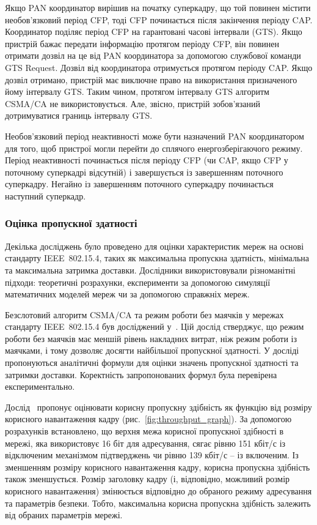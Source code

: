 \documentclass[a4paper,ukrainian,utf8,nocolumnsxix,floatsection]{eskdtext}
\renewcommand\paragraph{\subsubsection}
\newcommand{\figref}[1]{рис.~\ref{#1}}
\newcommand{\iee}[0]{IEEE~802.15.4\xspace}
\newcommand{\csma}[0]{CSMA/CA\xspace}
\begin{document}
Якщо PAN координатор вирішив на початку суперкадру, що  той повинен містити необов’язковий період CFP, тоді CFP починається після закінчення періоду CAP. Координатор поділяє період CFP на гарантовані часові інтервали (GTS). Якщо пристрій бажає передати інформацію протягом періоду CFP, він повинен отримати дозвіл на це від PAN координатора за допомогою службової команди GTS Request. Дозвіл від координатора отримується протягом періоду CAP. Якщо дозвіл отримано, пристрій має виключне право на використання призначеного йому інтервалу GTS. Таким чином, протягом інтервалу GTS алгоритм \csma не використовується. Але, звісно, пристрій зобов’язаний дотримуватися границь інтервалу GTS. 

Необов’язковий період неактивності може бути назначений PAN координатором для того, щоб пристрої могли перейти до сплячого енергозберігаючого режиму. Період неактивності починається після періоду CFP (чи CAP, якщо CFP у поточному суперкадрі відсутній) і завершується із завершенням поточного суперкадру.
Негайно із завершенням поточного суперкадру починається наступний суперкадр. 

\paragraph{Оцінка пропускної здатності}
\label{par:throughput:evaluation}

Декілька досліджень було проведено для оцінки характеристик мереж на основі стандарту \iee, таких як максимальна пропускна здатність, мінімальна та максимальна затримка доставки. Дослідники використовували різноманітні підходи: теоретичні розрахунки, експерименти за допомогою симуляції математичних моделей мереж чи за допомогою справжніх мереж.

Безслотовий алгоритм \csma та режим роботи без маячків у мережах стандарту \iee був досліджений у~\cite{thoroughput:analysis:unslotted:ieee}. Цій дослід стверджує, що режим роботи без маячків має меншій рівень накладних витрат, ніж режим роботи із маячками, і тому дозволяє досягти найбільшої пропускної здатності. У досліді пропонуються аналітичні формули для оцінки значень пропускної здатності та затримки доставки. Коректність запропонованих формул була перевірена експериментально.

Дослід~\cite{thoroughput:analysis:unslotted:ieee} пропонує оцінювати корисну пропускну здібність як функцію від розміру корисного навантаження кадру (\figref{fig:throughput_graph}). За допомогою розрахунків встановлено, що верхня межа корисної пропускної здібності в мережі, яка використовує 16 біт для адресування, сягає рівню 151 кбіт/с із відключеним механізмом підтверджень чи рівню 139 кбіт/с – із включеним. Із зменшенням розміру корисного навантаження кадру, корисна пропускна здібність також зменшується. Розмір заголовку кадру (і, відповідно, можливий розмір корисного навантаження) змінюється відповідно до обраного режиму адресування та параметрів безпеки. Тобто, максимальна корисна пропускна здібність залежить від обраних параметрів мережі.
\end{document}

